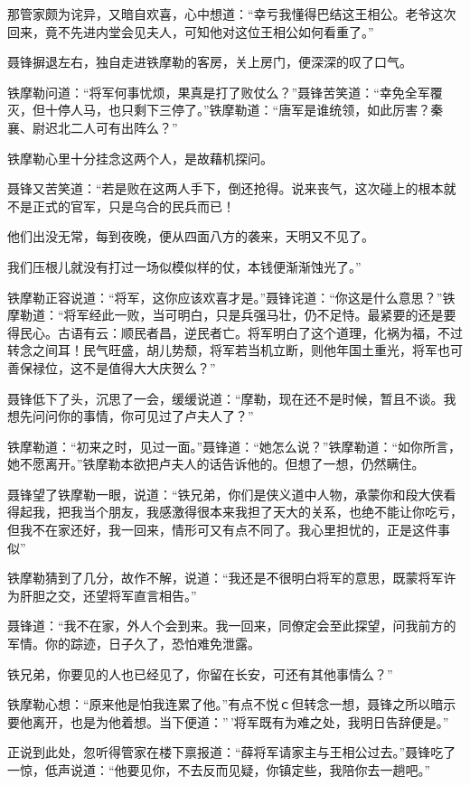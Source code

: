 \documentclass[12pt,oneside]{book}
\begin{document}
那管家颇为诧异，又暗自欢喜，心中想道：``幸亏我懂得巴结这王相公。老爷这次回来，竟不先进内堂会见夫人，可知他对这位王相公如何看重了。''

聂锋摒退左右，独自走进铁摩勒的客房，关上房门，便深深的叹了口气。

铁摩勒问道：``将军何事忧烦，果真是打了败仗么？''聂锋苦笑道：``幸免全军覆灭，但十停人马，也只剩下三停了。''铁摩勒道：``唐军是谁统领，如此厉害？秦襄、尉迟北二人可有出阵么？''

铁摩勒心里十分挂念这两个人，是故藉机探问。

聂锋又苦笑道：``若是败在这两人手下，倒还抢得。说来丧气，这次碰上的根本就不是正式的官军，只是乌合的民兵而已！

他们出没无常，每到夜晚，便从四面八方的袭来，天明又不见了。

我们压根儿就没有打过一场似模似样的仗，本钱便渐渐蚀光了。''

铁摩勒正容说道：``将军，这你应该欢喜才是。''聂锋诧道：``你这是什么意思？''铁摩勒道：``将军经此一败，当可明白，只是兵强马壮，仍不足恃。最紧要的还是要得民心。古语有云：顺民者昌，逆民者亡。将军明白了这个道理，化祸为福，不过转念之间耳！民气旺盛，胡儿势颓，将军若当机立断，则他年国土重光，将军也可善保禄位，这不是值得大大庆贺么？''

聂锋低下了头，沉思了一会，缓缓说道：``摩勒，现在还不是时候，暂且不谈。我想先问问你的事情，你可见过了卢夫人了？''

铁摩勒道：``初来之时，见过一面。''聂锋道：``她怎么说？''铁摩勒道：``如你所言，她不愿离开。''铁摩勒本欲把卢夫人的话告诉他的。但想了一想，仍然瞒住。

聂锋望了铁摩勒一眼，说道：``铁兄弟，你们是侠义道中人物，承蒙你和段大侠看得起我，把我当个朋友，我感激得很本来我担了天大的关系，也绝不能让你吃亏，但我不在家还好，我一回来，情形可又有点不同了。我心里担忧的，正是这件事似''

铁摩勒猜到了几分，故作不解，说道：``我还是不很明白将军的意思，既蒙将军许为肝胆之交，还望将军直言相告。''

聂锋道：``我不在家，外人个会到来。我一回来，同僚定会至此探望，问我前方的军情。你的踪迹，日子久了，恐怕难免泄露。

铁兄弟，你要见的人也已经见了，你留在长安，可还有其他事情么？''

铁摩勒心想：``原来他是怕我连累了他。''有点不悦ｃ但转念一想，聂锋之所以暗示要他离开，也是为他着想。当下便道：''\,'将军既有为难之处，我明日告辞便是。''

正说到此处，忽听得管家在楼下禀报道：``薛将军请家主与王相公过去。''聂锋吃了一惊，低声说道：``他要见你，不去反而见疑，你镇定些，我陪你去一趟吧。''
\end{document}
